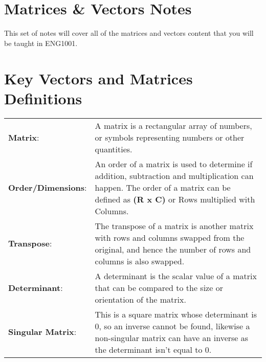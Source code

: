 \documentclass[a4paper,12pt]{article}
\begin{document}
\pagestyle{empty} 

\section{\huge\textbf{Matrices \& Vectors Notes}}
This set of notes will cover all of the matrices and vectors content that you will be taught in ENG1001.
\section{Key Vectors and Matrices Definitions}
\begin{tabularx}{\linewidth}{@{}l X@{}}
\textbf{Matrix}: &  \normalsize{A matrix is a rectangular array of numbers, or symbols representing numbers or other quantities.}
\\
\textbf{Order/Dimensions}: &  \normalsize{An order of a matrix is used to determine if addition, subtraction and multiplication can happen. The order of a matrix can be defined as \textbf{(R x C)} or Rows multiplied with Columns. }\\
\textbf{Transpose}: &  \normalsize{The transpose of a matrix is another matrix with rows and columns swapped from the original,
and hence the number of rows and columns is also swapped.}\\  
\textbf{Determinant}: &  \normalsize{A determinant is the scalar value of a matrix that can be compared to the size or orientation of the matrix.}\\
\textbf{Singular Matrix}: &  \normalsize{This is a square matrix whose determinant is 0, so an inverse cannot be found, likewise a non-singular matrix can have an inverse as the determinant isn't equal to 0.}\\
\end{tabularx}
\end{document}
